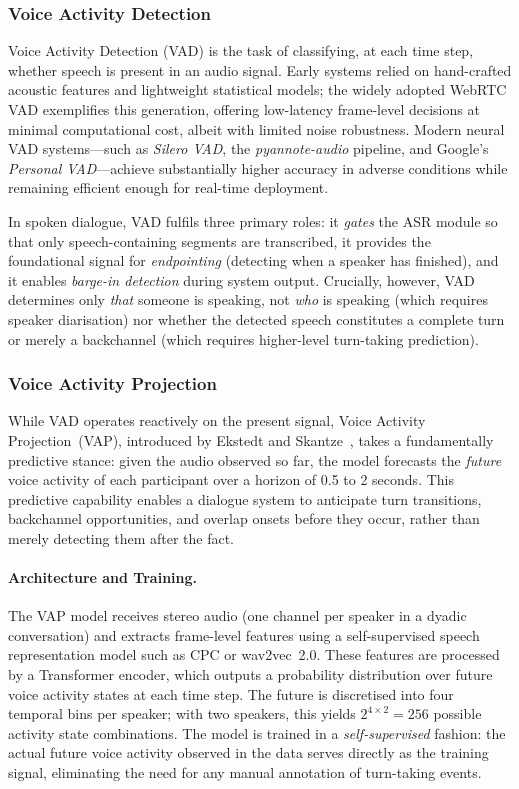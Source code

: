 \subsubsection{Voice Activity Detection}

Voice Activity Detection (VAD) is the task of classifying, at each time step, whether speech is present in an audio signal.  Early systems relied on hand-crafted acoustic features and lightweight statistical models; the widely adopted WebRTC VAD exemplifies this generation, offering low-latency frame-level decisions at minimal computational cost, albeit with limited noise robustness.  Modern neural VAD systems---such as \emph{Silero VAD}, the \emph{pyannote-audio} pipeline, and Google's \emph{Personal VAD}---achieve substantially higher accuracy in adverse conditions while remaining efficient enough for real-time deployment.

In spoken dialogue, VAD fulfils three primary roles: it \emph{gates} the ASR module so that only speech-containing segments are transcribed, it provides the foundational signal for \emph{endpointing} (detecting when a speaker has finished), and it enables \emph{barge-in detection} during system output.  Crucially, however, VAD determines only \emph{that} someone is speaking, not \emph{who} is speaking (which requires speaker diarisation) nor whether the detected speech constitutes a complete turn or merely a backchannel (which requires higher-level turn-taking prediction).

\subsubsection{Voice Activity Projection}

While VAD operates reactively on the present signal, Voice Activity Projection~(VAP), introduced by Ekstedt and Skantze~\cite{ekstedt2022vap}, takes a fundamentally predictive stance: given the audio observed so far, the model forecasts the \emph{future} voice activity of each participant over a horizon of 0.5 to 2 seconds. This predictive capability enables a dialogue system to anticipate turn transitions, backchannel opportunities, and overlap onsets before they occur, rather than merely detecting them after the fact.

\paragraph{Architecture and Training.}
The VAP model receives stereo audio (one channel per speaker in a dyadic conversation) and extracts frame-level features using a self-supervised speech representation model such as CPC or wav2vec~2.0. These features are processed by a Transformer encoder, which outputs a probability distribution over future voice activity states at each time step. The future is discretised into four temporal bins per speaker; with two speakers, this yields $2^{4 \times 2} = 256$ possible activity state combinations. The model is trained in a \emph{self-supervised} fashion: the actual future voice activity observed in the data serves directly as the training signal, eliminating the need for any manual annotation of turn-taking events.

